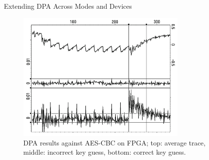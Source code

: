 \begin{frame}{Extending DPA Across Modes and Devices}
    \begin{figure}
        \centering
        \includegraphics[width=0.75\textwidth]{main thing/Pictures/aes_cbc_fpga.png}
        \caption{DPA results against AES-CBC on FPGA; top: average trace, middle: incorrect key guess, bottom: correct key guess.}
    \end{figure}
\end{frame}







